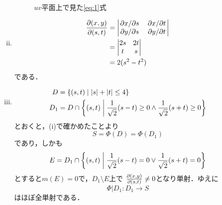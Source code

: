 \begin{enumerate}[(1)]
\begin{enumerate}[(i)]
\begin{figure}[H]
            \caption{$uv$平面上で見た\eqref{eq:1}式}
            \label{pic:uv}
        \end{figure}
        \item \begin{align}
            \Jacobi{x,y}{s,t}
            &=\mqty|
                \pdv*{x}{s} & \pdv*{x}{t}\\
                \pdv*{y}{s} & \pdv*{y}{t}
                |\\
            &=\mqty|
                2s & 2t\\
                t & s
                |\\
            &=2(s^2-t^2)
        \end{align}
        である．
        \item 
        \begin{align}
            D&=\qty{(s,t)\mathrel{}\middle|\mathrel{}\abs{s}+\abs{t}\le 4}\\
            D_1&=D\cap \qty{(s,t)\mathrel{}\middle|\mathrel{}\frac{1}{\sqrt{2}}(s-t)\ge 0\land \frac{1}{\sqrt{2}}(s+t)\ge 0}
        \end{align}
        とおくと，(i)で確かめたことより
        \begin{equation}
            S=\Phi(D)=\Phi(D_1)
        \end{equation}
        であり，しかも
        \begin{equation}
            E=D_1\cap \qty{(s,t)\mathrel{}\middle|\mathrel{}\frac{1}{\sqrt{2}}(s-t)= 0\lor \frac{1}{\sqrt{2}}(s+t)= 0}
        \end{equation}
        とすると$m(E) =0$で，$D_1\setminus E$上で
        $\frac{\partial ({x,y})}{\partial ({s,t})}\ne 0$となり単射．ゆえに
        \begin{equation}
            \Phi|D_1 : D_1 \to S
        \end{equation}
        はほぼ全単射である．


\end{enumerate}
\end{enumerate}
